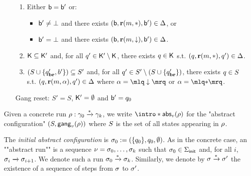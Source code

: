 \begin{definition}
\begin{enumerate}
\begin{enumerate}[label=(\roman*)]
		\item\label{item:external_broadcast_boss}Either $\mathsf{b} = \mathsf{b}'$ or:
		\begin{itemize} 
			\item $\mathsf{b}' \ne \bot$ and there exists $(\mathsf{b}, \textbf{r}(m, {*}), \mathsf{b}') \in \Delta$, or
			\item $\mathsf{b}' = \bot$ and there exists $(\mathsf{b}, \textbf{r}(m, \downarrow), \mathsf{b}') \in \Delta$.
		\end{itemize}

		\item\label{item:external_broadcast_clique}$\mathsf{K} \subseteq \mathsf{K}'$ and, for all $q' \in \mathsf{K}' \setminus \mathsf{K}$, there exists $q \in \mathsf{K}$ s.t. $(q, \textbf{r}(m, {*}), q') \in \Delta$.
		
		\item\label{item:external_broadcast_covset}$(S \cup \{q_{\textbf{br}}', b'\}) \subseteq S'$ and, for all $q' \in S' \setminus (S \cup \{q_{\textbf{br}}'\})$, there exists $q \in S$ s.t. $(q, \textbf{r}(m, \alpha), q') \in \Delta$ where $\anact = \quotemarks{\enregact}$ or $\anact = \quotemarks{\dummyact}$.
	\end{enumerate}
	\item[Gang reset:] $S' = S$, $\mathsf{K}' = \emptyset$ and $\mathsf{b}'= q_0$
\end{enumerate}


Given a concrete run $\rho: \gamma_0 \xrightarrow{*} \gamma_k$, we write \AP  $\intro*\absproj{\aval}{\run}$ for the "abstract configuration" $(S, \mathsf{gang}_{v}(\rho))$ where $S$ is the set of all states appearing in $\rho$. 

The \emph{initial abstract configuration} is $\sigma_0 := (\{q_0\}, q_0, \emptyset)$. 
As in the concrete case, an ""abstract run"" is a sequence $\nu = \sigma_0, \dots, \sigma_k$ such that $\sigma_0 \in \Sigma_{\mathsf{init}}$ and, for all $i$, $\sigma_i \xrightarrow{} \sigma_{i+1}$. We denote such a run $\sigma_0 \xrightarrow{*} \sigma_k$. Similarly, we denote by $\sigma \xrightarrow{*} \sigma'$ the existence of a sequence of steps from $\sigma$ to $\sigma'$.
\end{definition}


